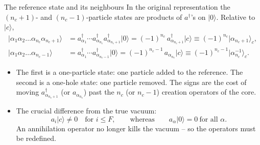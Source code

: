 \documentclass[aspectratio=169,10pt]{beamer}
\newcommand{\ket}[1]{\vert #1\rangle}
\begin{document}
\begin{frame}{The reference state and its neighbours}
  In the original representation the $(n_c+1)$- and $(n_c-1)$-particle states are products of $a^{\dagger}$'s on $\ket{0}$. Relative to $\ket{c}$,
  \begin{align*}
    \ket{\alpha_1\alpha_2\dots\alpha_{n_c}\alpha_{n_c+1}}
    &=a_{\alpha_1}^{\dagger}\cdots a_{\alpha_{n_c}}^{\dagger}a_{\alpha_{n_c+1}}^{\dagger}\ket{0}
    =(-1)^{n_c}\,a_{\alpha_{n_c+1}}^{\dagger}\ket{c}\equiv(-1)^{n_c}\ket{\alpha_{n_c+1}}_c,\\[4pt]
    \ket{\alpha_1\alpha_2\dots\alpha_{n_c-1}}
    &=a_{\alpha_1}^{\dagger}\cdots a_{\alpha_{n_c-1}}^{\dagger}\ket{0}
    =(-1)^{n_c-1}\,a_{\alpha_{n_c}}\ket{c}\equiv(-1)^{n_c-1}\ket{\alpha_{n_c}^{-1}}_c .
  \end{align*}
  \begin{itemize}
    \item The first is a \alert{one-particle state}: one particle added to the reference. The second is a \alert{one-hole state}: one particle removed. The signs are the cost of moving $a_{\alpha_{n_c+1}}^{\dagger}$ (or $a_{\alpha_{n_c}}$) past the $n_c$ (or $n_c-1$) creation operators of the core.
    \item The crucial difference from the true vacuum:
    \[
      a_i\ket{c}\neq0\quad\text{for }i\le F,
      \qquad\text{whereas}\qquad a_\alpha\ket{0}=0\ \text{for all }\alpha .
    \]
    An annihilation operator no longer kills the vacuum -- so the operators must be redefined.
  \end{itemize}
\end{frame}
\end{document}
